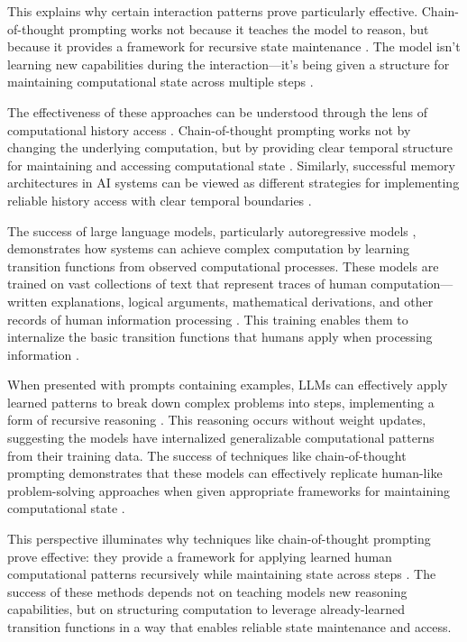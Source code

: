 \documentclass[12pt]{article}
\begin{document}
This explains why certain interaction patterns prove particularly effective.
Chain-of-thought prompting works not because it teaches the model to reason, but because it provides a framework for recursive state maintenance \cite{wei2022chain}.
The model isn't learning new capabilities during the interaction---it's being given a structure for maintaining computational state across multiple steps \cite{ahn2024recursive}.

The effectiveness of these approaches can be understood through the lens of computational history access \cite{fu2024memory}.
Chain-of-thought prompting works not by changing the underlying computation, but by providing clear temporal structure for maintaining and accessing computational state \cite{wei2022chain}.
Similarly, successful memory architectures in AI systems can be viewed as different strategies for implementing reliable history access with clear temporal boundaries \cite{yang2013survey}.

The success of large language models, particularly autoregressive models \cite{schuurmans2024autoregressive}, demonstrates how systems can achieve complex computation by learning transition functions from observed computational processes.
These models are trained on vast collections of text that represent traces of human computation---written explanations, logical arguments, mathematical derivations, and other records of human information processing \cite{brown2020language}.
This training enables them to internalize the basic transition functions that humans apply when processing information \cite{wei2022chain}.

When presented with prompts containing examples, LLMs can effectively apply learned patterns to break down complex problems into steps, implementing a form of recursive reasoning \cite{wei2022chain}.
This reasoning occurs without weight updates, suggesting the models have internalized generalizable computational patterns from their training data.
The success of techniques like chain-of-thought prompting demonstrates that these models can effectively replicate human-like problem-solving approaches when given appropriate frameworks for maintaining computational state \cite{wei2022emergent}.

This perspective illuminates why techniques like chain-of-thought prompting prove effective: they provide a framework for applying learned human computational patterns recursively while maintaining state across steps \cite{wei2022chain}.
The success of these methods depends not on teaching models new reasoning capabilities, but on structuring computation to leverage already-learned transition functions in a way that enables reliable state maintenance and access.
\end{document}
